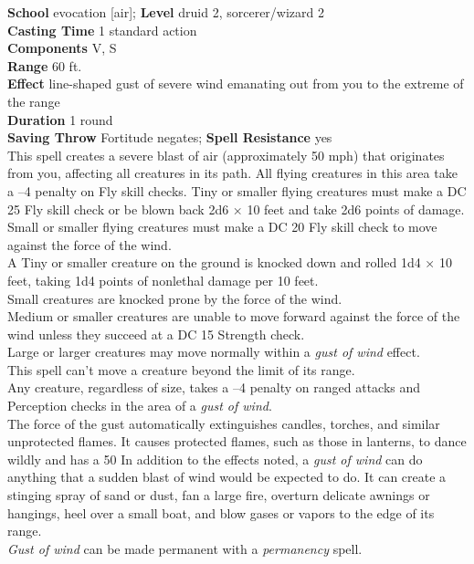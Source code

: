 \textbf{School} evocation [air]; \textbf{Level} druid 2, sorcerer/wizard 2\\
\textbf{Casting Time} 1 standard action\\
\textbf{Components} V, S\\
\textbf{Range} 60 ft.\\
\textbf{Effect} line-shaped gust of severe wind emanating out from you to the extreme of the range\\
\textbf{Duration} 1 round\\
\textbf{Saving Throw} Fortitude negates; \textbf{Spell Resistance} yes\\
This spell creates a severe blast of air (approximately 50 mph) that originates from you, affecting all creatures in its path. All flying creatures in this area take a --4 penalty on Fly skill checks. Tiny or smaller flying creatures must make a DC 25 Fly skill check or be blown back 2d6 × 10 feet and take 2d6 points of damage. Small or smaller flying creatures must make a DC 20 Fly skill check to move against the force of the wind.\\
A Tiny or smaller creature on the ground is knocked down and rolled 1d4 × 10 feet, taking 1d4 points of nonlethal damage per 10 feet.\\
Small creatures are knocked prone by the force of the wind.\\
Medium or smaller creatures are unable to move forward against the force of the wind unless they succeed at a DC 15 Strength check.\\
Large or larger creatures may move normally within a \textit{gust of wind }effect.\\
This spell can't move a creature beyond the limit of its range.\\
Any creature, regardless of size, takes a --4 penalty on ranged attacks and Perception checks in the area of a \textit{gust of wind}.\\
The force of the gust automatically extinguishes candles, torches, and similar unprotected flames. It causes protected flames, such as those in lanterns, to dance wildly and has a 50%
In addition to the effects noted, a \textit{gust of wind }can do anything that a sudden blast of wind would be expected to do. It can create a stinging spray of sand or dust, fan a large fire, overturn delicate awnings or hangings, heel over a small boat, and blow gases or vapors to the edge of its range.\\
\textit{Gust of wind }can be made permanent with a \textit{permanency }spell.\\
